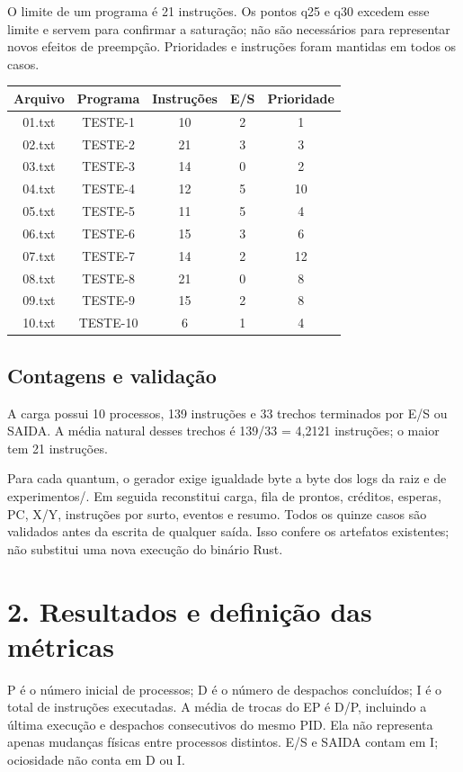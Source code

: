 \documentclass[10pt,a4paper]{article}
\begin{document}
O limite de um programa é 21 instruções. Os pontos q25 e q30 excedem esse limite e servem para confirmar a saturação; não são necessários para representar novos efeitos de preempção. Prioridades e instruções foram mantidas em todos os casos.

\begin{center}
\small
\begin{tabular}{ccccc}
\hline
\textbf{Arquivo} & \textbf{Programa} & \textbf{Instruções} & \textbf{E/S} & \textbf{Prioridade} \\
\hline
01.txt & TESTE-1 & 10 & 2 & 1 \\
02.txt & TESTE-2 & 21 & 3 & 3 \\
03.txt & TESTE-3 & 14 & 0 & 2 \\
04.txt & TESTE-4 & 12 & 5 & 10 \\
05.txt & TESTE-5 & 11 & 5 & 4 \\
06.txt & TESTE-6 & 15 & 3 & 6 \\
07.txt & TESTE-7 & 14 & 2 & 12 \\
08.txt & TESTE-8 & 21 & 0 & 8 \\
09.txt & TESTE-9 & 15 & 2 & 8 \\
10.txt & TESTE-10 & 6 & 1 & 4 \\
\hline
\end{tabular}
\end{center}
\subsection*{Contagens e validação}
A carga possui 10 processos, 139 instruções e 33 trechos terminados por E/S ou SAIDA. A média natural desses trechos é 139/33 = 4,2121 instruções; o maior tem 21 instruções.

Para cada quantum, o gerador exige igualdade byte a byte dos logs da raiz e de experimentos/. Em seguida reconstitui carga, fila de prontos, créditos, esperas, PC, X/Y, instruções por surto, eventos e resumo. Todos os quinze casos são validados antes da escrita de qualquer saída. Isso confere os artefatos existentes; não substitui uma nova execução do binário Rust.

\clearpage
\section*{2. Resultados e definição das métricas}
P é o número inicial de processos; D é o número de despachos concluídos; I é o total de instruções executadas. A média de trocas do EP é D/P, incluindo a última execução e despachos consecutivos do mesmo PID. Ela não representa apenas mudanças físicas entre processos distintos. E/S e SAIDA contam em I; ociosidade não conta em D ou I.
\end{document}
